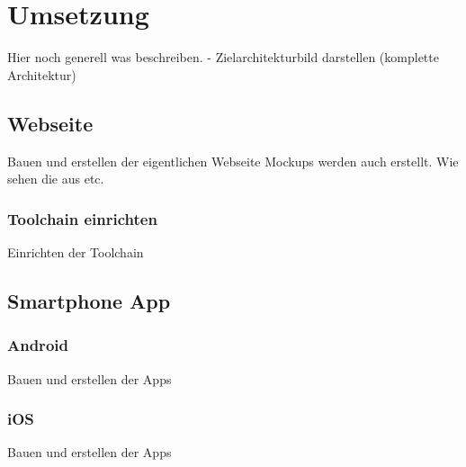\section{Umsetzung}
Hier noch generell was beschreiben. - Zielarchitekturbild darstellen (komplette Architektur)

\subsection{Webseite}
\label{subsec:webseite}
Bauen und erstellen der eigentlichen Webseite
Mockups werden auch erstellt. Wie sehen die aus etc.

\subsubsection{Toolchain einrichten}
Einrichten der Toolchain

\subsection{Smartphone App}

\subsubsection{Android}
Bauen und erstellen der Apps

\subsubsection{iOS}
Bauen und erstellen der Apps